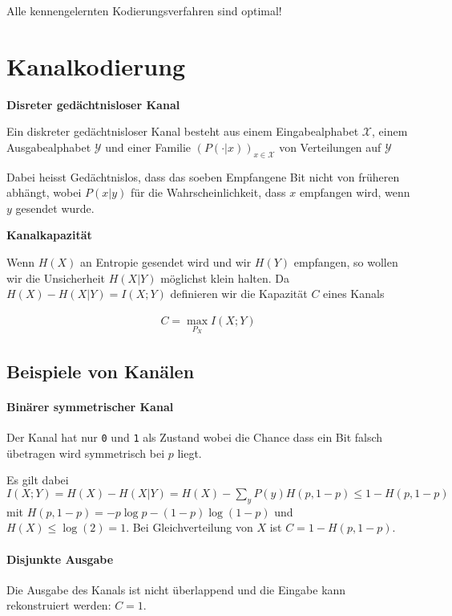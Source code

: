 \documentclass[25pt]{sciposter}
\newenvironment{defn}[1]{\begin{mdframed}[backgroundcolor=blue!10,innertopmargin=15pt, nobreak=true,innerbottommargin=15pt]
		\textbf{#1 }
	}
	{ 
	\end{mdframed}
}
\begin{document}
\begin{multicols}{3}
Alle kennengelernten Kodierungsverfahren sind optimal!


\section{Kanalkodierung}


\begin{defn}{Disreter gedächtnisloser Kanal}
	Ein diskreter gedächtnisloser Kanal besteht aus einem Eingabealphabet $\mathcal{X}$, einem Ausgabealphabet $\mathcal{Y}$ und einer Familie $(P(\cdot|x))_{x\in \mathcal{X}}$ von Verteilungen auf $\mathcal{Y}$
	
	Dabei heisst Gedächtnislos, dass das soeben Empfangene Bit nicht von früheren abhängt, wobei $P(x|y)$ für die Wahrscheinlichkeit, dass $x$ empfangen wird, wenn $y$ gesendet wurde.
\end{defn}

\begin{defn}{Kanalkapazität}
	Wenn $H(X)$ an Entropie gesendet wird und wir $H(Y)$ empfangen, so wollen wir die Unsicherheit $H(X|Y)$ möglichst klein halten. Da $H(X) - H(X|Y) = I(X;Y)$ definieren wir die Kapazität $C$ eines Kanals
	
	\begin{align*}
		C = \max_{P_X}I(X;Y)
	\end{align*}
\end{defn}


\subsection*{Beispiele von Kanälen}

\paragraph{Binärer symmetrischer Kanal}
Der Kanal hat nur \texttt{0} und \texttt{1} als Zustand wobei die Chance dass ein Bit falsch übetragen wird symmetrisch bei $p$ liegt.

Es gilt dabei $I(X;Y) = H(X) - H(X|Y) = H(X) - \sum_{y}P(y) H(p,1-p) \leq 1 - H(p,1-p)$ mit $H(p,1-p) = -p\log p - (1-p)\log(1-p)$ und $H(X)\leq \log(2)=1$. Bei Gleichverteilung von $X$ ist $C = 1 - H(p,1-p)$.

\paragraph{Disjunkte Ausgabe}
Die Ausgabe des Kanals ist nicht überlappend und die Eingabe kann rekonstruiert werden: $C = 1$.


\end{multicols}
\end{document}
